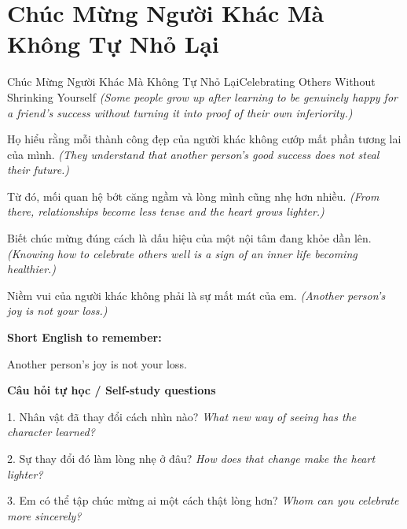 \section{Chúc Mừng Người Khác Mà Không Tự Nhỏ Lại}
\begin{truyen}{Chúc Mừng Người Khác Mà Không Tự Nhỏ Lại}{Celebrating Others Without Shrinking Yourself}
\textit{(Some people grow up after learning to be genuinely happy for a friend's success without turning it into proof of their own inferiority.)}

Họ hiểu rằng mỗi thành công đẹp của người khác không cướp mất phần tương lai của mình.
\textit{(They understand that another person's good success does not steal their future.)}

Từ đó, mối quan hệ bớt căng ngầm và lòng mình cũng nhẹ hơn nhiều.
\textit{(From there, relationships become less tense and the heart grows lighter.)}

Biết chúc mừng đúng cách là dấu hiệu của một nội tâm đang khỏe dần lên.
\textit{(Knowing how to celebrate others well is a sign of an inner life becoming healthier.)}

\end{truyen}

\begin{baihoc}
Niềm vui của người khác không phải là sự mất mát của em.
\textit{(Another person's joy is not your loss.)}
\end{baihoc}

\begin{ghinhoanh}
\textbf{Short English to remember:}

Another person's joy is not your loss.

\end{ghinhoanh}

\begin{tuhocnhanh}
\textbf{Câu hỏi tự học / Self-study questions}

1. Nhân vật đã thay đổi cách nhìn nào? \textit{What new way of seeing has the character learned?}

2. Sự thay đổi đó làm lòng nhẹ ở đâu? \textit{How does that change make the heart lighter?}

3. Em có thể tập chúc mừng ai một cách thật lòng hơn? \textit{Whom can you celebrate more sincerely?}
\end{tuhocnhanh}
